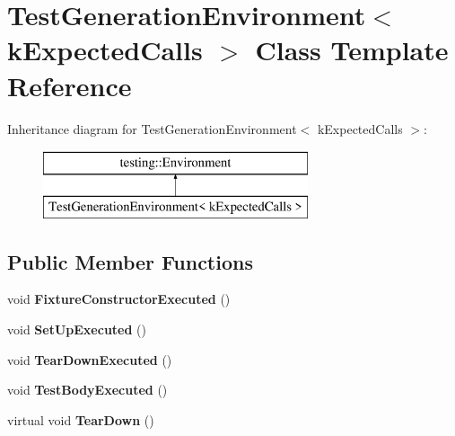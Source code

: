\hypertarget{class_test_generation_environment}{}\section{Test\+Generation\+Environment$<$ k\+Expected\+Calls $>$ Class Template Reference}
\label{class_test_generation_environment}
Inheritance diagram for Test\+Generation\+Environment$<$ k\+Expected\+Calls $>$\+:\begin{figure}[H]
\begin{center}
\leavevmode
\includegraphics[height=2.000000cm]{class_test_generation_environment}
\end{center}
\end{figure}
\subsection*{Public Member Functions}
\begin{DoxyCompactItemize}
\item 
\mbox{\label{class_test_generation_environment_abcdae77887fbd6dba18f4a55b80f058d}} 
void {\bfseries Fixture\+Constructor\+Executed} ()
\item 
\mbox{\label{class_test_generation_environment_aa17c620af5eb9929bdbde25820cd8e28}} 
void {\bfseries Set\+Up\+Executed} ()
\item 
\mbox{\label{class_test_generation_environment_a0d2576b10818bae1945e17e6e749ff9b}} 
void {\bfseries Tear\+Down\+Executed} ()
\item 
\mbox{\label{class_test_generation_environment_a358a1d7cbefc3f9157f625f87dbde754}} 
void {\bfseries Test\+Body\+Executed} ()
\item 
\mbox{\label{class_test_generation_environment_ac3787d8afb43b97b0b3d6dec78b04798}} 
virtual void {\bfseries Tear\+Down} ()
\end{DoxyCompactItemize}

